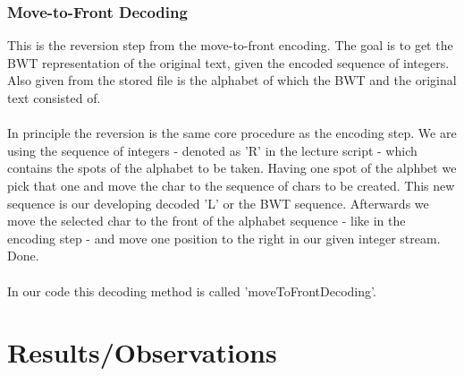 \documentclass[11pt, notitlepage]{scrartcl}
\begin{document}
\subsubsection{Move-to-Front Decoding}
This is the reversion step from the move-to-front encoding. The goal is to get the BWT representation of the original
text, given the encoded sequence of integers. Also given from the stored file is the alphabet of which the BWT and the
original text consisted of. \\\\
In principle the reversion is the same core procedure as the encoding step. We are using the sequence of integers -
denoted as 'R' in the lecture script - which contains the spots of the alphabet to be taken. Having one spot of the
alphbet we pick that one and move the char to the sequence of chars to be created. This new sequence is our developing
decoded 'L' or the BWT sequence. Afterwards we move the selected char to the front of the alphabet sequence - like in
the encoding step - and move one position to the right in our given integer stream. Done. \\\\
In our code this decoding method is called 'moveToFrontDecoding'.
\section{Results/Observations}
\end{document}
